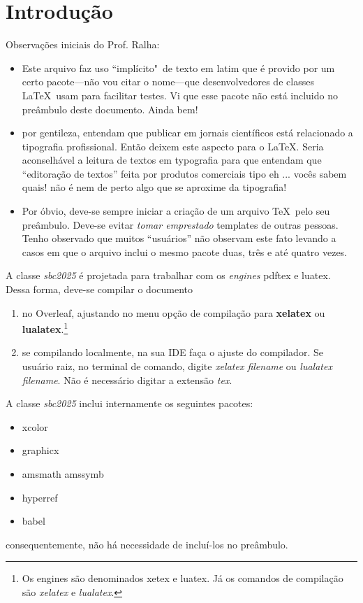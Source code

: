 
\section{Introdução}
\label{sec:intro}

Observações iniciais do Prof. Ralha:
\begin{itemize}
    \item Este arquivo faz uso ``implícito"\ de texto em latim que é provido por um certo pacote---não vou citar o nome---que desenvolvedores de classes \LaTeX\ usam para facilitar testes. Vi que esse pacote não está incluido no preâmbulo deste documento. Ainda bem!
    \item por gentileza, entendam que publicar em jornais científicos está relacionado a tipografia profissional. Então deixem este aspecto para o \LaTeX. Seria aconselhável a leitura de textos em typografia para que entendam que ``editoração de textos'' feita por produtos comerciais tipo eh ... vocês sabem quais! não é nem de perto algo que se aproxime da tipografia!
    \item Por óbvio, deve-se sempre iniciar a criação de um arquivo \TeX\ pelo seu preâmbulo. Deve-se evitar \textit{tomar emprestado} templates de outras pessoas. Tenho observado que muitos ``usuários'' não observam este fato levando a casos em que o arquivo inclui o mesmo pacote duas, três e até quatro vezes.
\end{itemize}

A classe \textsl{sbc2025} é projetada para trabalhar com os \textit{engines} pdftex e luatex. Dessa forma, deve-se compilar o documento 
\begin{enumerate}
    \item no Overleaf, ajustando no menu opção de compilação para \textbf{xelatex} ou \textbf{lualatex}.\footnote{Os engines são denominados xetex e luatex. Já os comandos de compilação são \textsl{xelatex} e \textsl{lualatex}.}
    \item se compilando localmente, na sua IDE faça o ajuste do compilador. Se usuário raiz, no terminal de comando, digite \textsl{xelatex filename} ou \textsl{lualatex filename}. Não é necessário digitar a extensão \textsl{tex}.
\end{enumerate}

A classe \textsl{sbc2025} inclui internamente os seguintes pacotes:
\begin{itemize}
    \item xcolor
    \item graphicx
    \item amsmath amssymb
    \item hyperref
    \item babel
\end{itemize}
\noindent consequentemente, não há necessidade de incluí-los no preâmbulo.

